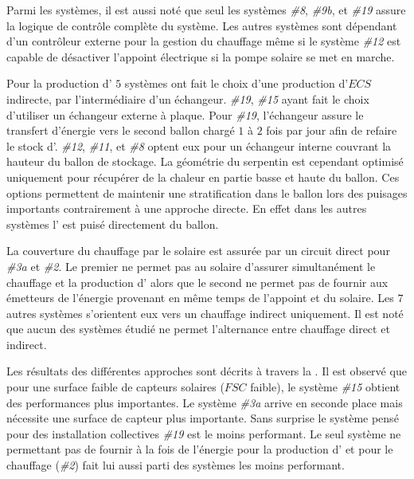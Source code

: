 Parmi les systèmes, il est aussi noté que seul les systèmes \emph{\#8}, \emph{\#9b},
et \emph{\#19} assure la logique de contrôle complète du système. Les autres systèmes
sont dépendant d’un contrôleur externe pour la gestion du chauffage même si le système
\emph{\#12} est capable de désactiver l’appoint électrique si la pompe solaire se met en marche.

Pour la production d’ $5$ systèmes ont fait le choix d’une production
d’$ECS$ indirecte, par l’intermédiaire d’un échangeur. \emph{\#19}, \emph{\#15} ayant fait le
choix d’utiliser un échangeur externe à plaque. Pour \emph{\#19}, l’échangeur
assure le transfert d’énergie vers le second ballon chargé $1$ à $2$ fois par jour afin
de refaire le stock d’. \emph{\#12}, \emph{\#11}, et \emph{\#8} optent eux pour
un échangeur interne couvrant la hauteur du ballon de stockage. La géométrie
du serpentin est cependant optimisé uniquement pour récupérer de la chaleur en
partie basse et haute du ballon. Ces options permettent de maintenir une
stratification dans le ballon lors des puisages importants contrairement à une approche
directe. En effet dans les autres systèmes l’ est puisé directement du ballon.

La couverture du chauffage par le solaire est assurée par un circuit direct pour
\emph{\#3a} et \emph{\#2}. Le premier ne permet pas au solaire d’assurer simultanément
le chauffage et la production d’ alors que le second ne permet pas de fournir
aux émetteurs de l’énergie provenant en même temps de l’appoint et du solaire.
Les $7$ autres systèmes s’orientent eux vers un chauffage indirect uniquement. Il est noté que
aucun des systèmes étudié ne permet l’alternance entre chauffage direct et indirect.

Les résultats des différentes approches sont décrits à travers la .
Il est observé que pour une surface faible de capteurs solaires ($FSC$ faible), le système \emph{\#15}
obtient des performances plus importantes. Le système \emph{\#3a} arrive en seconde place
mais nécessite une surface de capteur plus importante. Sans surprise le système pensé
pour des installation collectives \emph{\#19} est le moins performant. Le seul système
ne permettant pas de fournir à la fois de l’énergie pour la production d’
et pour le chauffage (\emph{\#2}) fait lui aussi parti des systèmes les moins performant.


